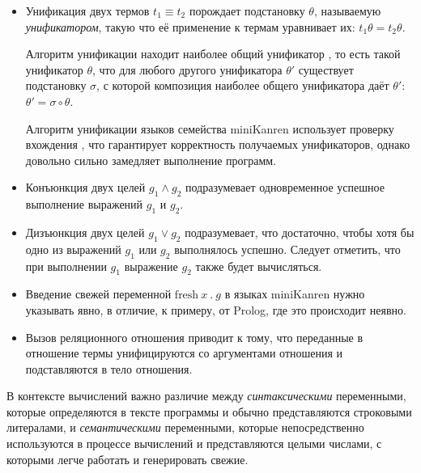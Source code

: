 \begin{itemize}
\item Унификация двух термов $t_1 \equiv t_2$ порождает подстановку $\theta$, называемую \emph{унификатором},
      такую что её применение к термам уравнивает их: $t_1 \theta = t_2 \theta$.

      Алгоритм унификации находит наиболее общий унификатор , то есть такой
      унификатор $\theta$, что для любого другого унификатора $\theta'$ существует подстановку $\sigma$,
      с которой композиция наиболее общего унификатора даёт $\theta'$: $\theta' = \sigma \circ \theta$\cite{unification}.

      Алгоритм унификации языков семейства miniKanren использует проверку вхождения ,
      что гарантирует корректность получаемых унификаторов, однако довольно сильно замедляет выполнение программ.

\item Конъюнкция двух целей $g_1 \land g_2$ подразумевает одновременное успешное выполнение выражений $g_1$ и $g_2$.
\item Дизъюнкция двух целей $g_1 \lor g_2$ подразумевает, что достаточно, чтобы хотя бы одно из выражений $g_1$ или $g_2$ выполнялось успешно.
      Следует отметить, что при выполнении $g_1$ выражение $g_2$ также будет вычисляться.
\item Введение свежей переменной $\text{fresh}\ x\ .\ g$ в языках miniKanren нужно указывать явно, в отличие, к примеру,
      от Prolog, где это происходит неявно.
\item Вызов реляционного отношения приводит к тому, что переданные в отношение термы
      унифицируются со аргументами отношения и подставляются в тело отношения. 
\end{itemize}

В контексте вычислений важно различие между \emph{синтаксическими} переменными, которые
определяются в тексте программы и обычно представляются строковыми литералами, и
\emph{семантическими} переменными, которые непосредственно используются в процессе вычислений и
представляются целыми числами, с которыми легче работать и генерировать свежие.

